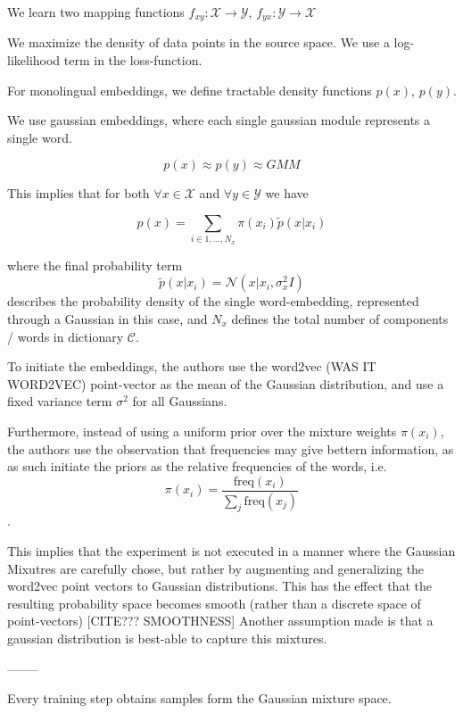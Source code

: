 \documentclass[a4paper,12pt,twoside,openright]{report}
\begin{document}
We learn two mapping functions $f_{xy} : \mathcal{X} \rightarrow \mathcal{Y}$, $f_{yx} : \mathcal{Y} \rightarrow \mathcal{X}$

We maximize the density of data points in the source space. 
We use a log-likelihood term in the loss-function.

For monolingual embeddings, we define tractable density functions $p(x)$, $p(y)$.

We use gaussian embeddings, where each single gaussian module represents a single word.

\begin{equation}
p(x) \approx p(y) \approx GMM
\end{equation}

This implies that for both $\forall x \in \mathcal{X}$ and $\forall y \in \mathcal{Y}$ we have

\begin{equation}
p(x) = \sum_{i \in {1, \ldots, N_x} } \pi(x_i) \tilde{p}(x|x_i)
\end{equation}

where the final probability term $$\tilde{p}(x|x_i) = \mathcal{N}(x | x_i, \sigma^2_x I) $$ describes the probability density of the single word-embedding, represented through a Gaussian in this case, and $N_x$ defines the total number of components / words in dictionary $\mathcal{C}$.

To initiate the embeddings, the authors use the word2vec (WAS IT WORD2VEC) point-vector as the mean of the Gaussian distribution, and use a fixed variance term $\sigma^2$ for all Gaussians.

Furthermore, instead of using a uniform prior over the mixture weights $\pi(x_i)$, the authors use the observation that frequencies may give bettern information, as as such initiate the priors as the relative frequencies of the words, i.e. $$ \pi(x_i) = \frac{ \text{freq} (x_i) }{\sum_j \text{freq} (x_j) } $$ .

This implies that the experiment is not executed in a manner where the Gaussian Mixutres are carefully chose, but rather by augmenting and generalizing the word2vec point vectors to Gaussian distributions.
This has the effect that the resulting probability space becomes smooth (rather than a discrete space of point-vectors) [CITE??? SMOOTHNESS]
Another assumption made is that a gaussian distribution is best-able to capture this mixtures.

--------

Every training step obtains samples form the Gaussian mixture space.
\end{document}
